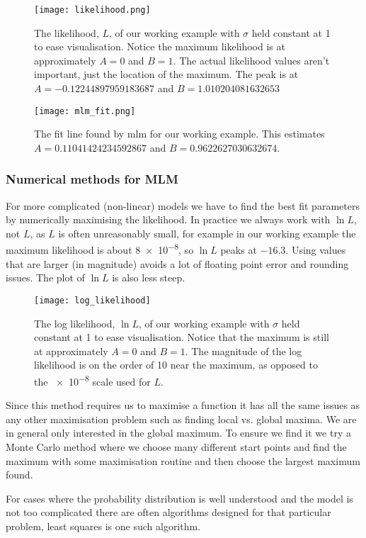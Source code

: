 \documentclass[a4paper]{article}
\begin{document}
    \begin{figure}[ht]
        \centering
        \texttt{[image: likelihood.png]}
        \caption{The likelihood, \(L\), of our working example with \(\sigma\) held constant at 1 to ease visualisation. Notice the maximum likelihood is at approximately \(A = 0\) and \(B = 1\). The actual likelihood values aren't important, just the location of the maximum. The peak is at \(A = -0.12244897959183687\) and \(B = 1.010204081632653\)}
    \end{figure}
    \begin{figure}[ht]
        \centering
        \texttt{[image: mlm\_fit.png]}
        \caption{The fit line found by \gls{mlm} for our working example. This estimates \(A = 0.11041424234592867\) and  \(B = 0.9622627030632674\).}
    \end{figure}

    \subsubsection{Numerical methods for MLM}
    For more complicated (non-linear) models we have to find the best fit parameters by numerically maximising the likelihood.
    In practice we always work with \(\ln L\), not \(L\), as \(L\) is often unreasonably small, for example in our working example the maximum likelihood is about \num{8e-8}, so \(\ln L\) peaks at \(-16.3\).
    Using values that are larger (in magnitude) avoids a lot of floating point error and rounding issues.
    The plot of \(\ln L\) is also less steep.
    \begin{figure}[ht]
        \centering
        \texttt{[image: log\_likelihood]}
        \caption{The log likelihood, \(\ln L\), of our working example with \(\sigma\) held constant at 1 to ease visualisation. Notice that the maximum is still at approximately \(A = 0\) and \(B = 1\). The magnitude of the log likelihood is on the order of 10 near the maximum, as opposed to the \num{e-8} scale used for \(L\).}
    \end{figure}
    Since this method requires us to maximise a function it has all the same issues as any other maximisation problem such as finding local vs. global maxima.
    We are in general only interested in the global maximum.
    To ensure we find it we try a Monte Carlo method where we choose many different start points and find the maximum with some maximisation routine and then choose the largest maximum found.
    
    For cases where the probability distribution is well understood and the model is not too complicated there are often algorithms designed for that particular problem, least squares is one such algorithm.
    
\end{document}
